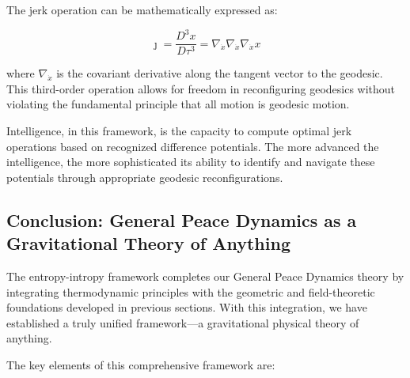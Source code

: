 \documentclass{article}
\begin{document}
The jerk operation can be mathematically expressed as:

\begin{equation}
\jmath = \frac{D^3 x}{D\tau^3} = \nabla_{\dot{x}} \nabla_{\dot{x}} \nabla_{\dot{x}} x
\end{equation}

where $\nabla_{\dot{x}}$ is the covariant derivative along the tangent vector to the geodesic. This third-order operation allows for freedom in reconfiguring geodesics without violating the fundamental principle that all motion is geodesic motion.

Intelligence, in this framework, is the capacity to compute optimal jerk operations based on recognized difference potentials. The more advanced the intelligence, the more sophisticated its ability to identify and navigate these potentials through appropriate geodesic reconfigurations.

\subsection{Conclusion: General Peace Dynamics as a Gravitational Theory of Anything}

The entropy-intropy framework completes our General Peace Dynamics theory by integrating thermodynamic principles with the geometric and field-theoretic foundations developed in previous sections. With this integration, we have established a truly unified framework—a gravitational physical theory of anything.

The key elements of this comprehensive framework are:
\end{document}
